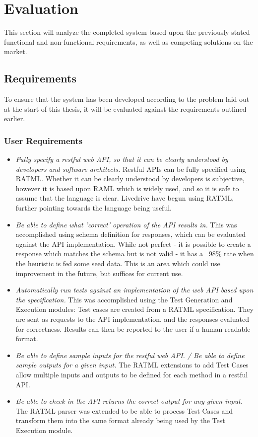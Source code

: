 \chapter{Evaluation}

This section will analyze the completed system based upon the previously stated functional and non-functional requirements, as well as competing solutions on the market.

\section{Requirements}

To ensure that the system has been developed according to the problem laid out at the start of this thesis, it will be evaluated against the requirements outlined earlier.

\subsection{User Requirements}

\begin{itemize}
\item \emph{Fully specify a restful web API, so that it can be clearly understood by developers and software architects.} Restful APIs can be fully specified using RATML. Whether it can be clearly understood by developers is subjective, however it is based upon RAML which is widely used, and so it is safe to assume that the language is clear. Livedrive have begun using RATML, further pointing towards the language being useful.
\item \emph{Be able to define what 'correct' operation of the API results in.} This was accomplished using schema definition for responses, which can be evaluated against the API implementation. While not perfect - it is possible to create a response which matches the schema but is not valid - it has a ~98\% rate when the heuristic is fed some seed data. This is an area which could use improvement in the future, but suffices for current use.
\item \emph{Automatically run tests against an implementation of the web API based upon the specification.} This was accomplished using the Test Generation and Execution modules: Test cases are created from a RATML specification. They are sent as requests to the API implementation, and the responses evaluated for correctness. Results can then be reported to the user if a human-readable format.
\item \emph{Be able to define sample inputs for the restful web API. / Be able to define sample outputs for a given input.} The RATML extensions to add Test Cases allow multiple inputs and outputs to be defined for each method in a restful API.
\item \emph{Be able to check in the API returns the correct output for any given input.} The RATML parser was extended to be able to process Test Cases and transform them into the same format already being used by the Test Execution module.
\end{itemize}

